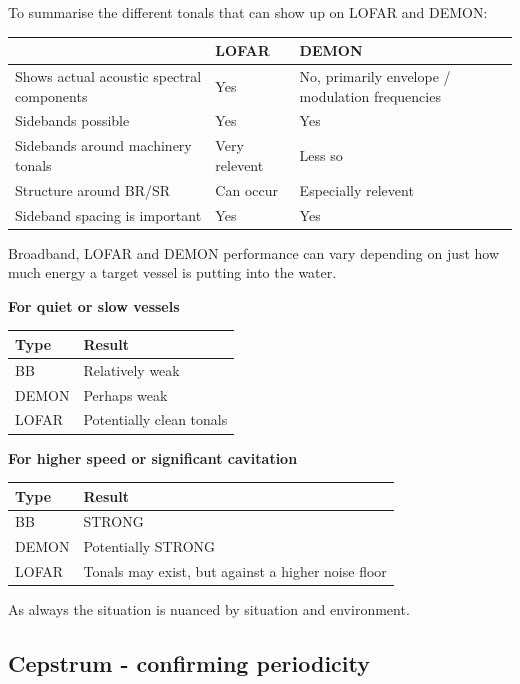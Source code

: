 To summarise the different tonals that can show up on LOFAR and DEMON:

\begin{tabularx}{\linewidth}{l l X}
    \toprule
    \textbf{} & \textbf{LOFAR} & \textbf{DEMON} \\
    \midrule
    \rowcolor[gray]{.9} Shows actual acoustic spectral components & Yes & No, primarily envelope / modulation frequencies \\
    Sidebands possible & Yes & Yes \\
    \rowcolor[gray]{.9}Sidebands around machinery tonals & Very relevent & Less so \\
    Structure around BR/SR & Can occur & Especially relevent \\
    \rowcolor[gray]{.9}Sideband spacing is important & Yes & Yes \\
    \bottomrule
\end{tabularx}

Broadband, LOFAR and DEMON performance can vary depending on just how much energy a target vessel is putting into the water.

\textbf{For quiet or slow vessels}

\begin{tabularx}{\linewidth}{l X}
    \toprule
    \textbf{Type} & \textbf{Result} \\
    \midrule
    BB & Relatively weak \\
    DEMON & Perhaps weak \\
    LOFAR & Potentially clean tonals \\
    \bottomrule
\end{tabularx}

\textbf{For higher speed or significant cavitation}

\begin{tabularx}{\linewidth}{l X}
    \toprule
    \textbf{Type} & \textbf{Result} \\
    \midrule
    BB & STRONG \\
    DEMON & Potentially STRONG \\
    LOFAR & Tonals may exist, but against a higher noise floor \\
    \bottomrule
\end{tabularx}

As always the situation is nuanced by situation and environment.

\subsection{Cepstrum - confirming periodicity}

